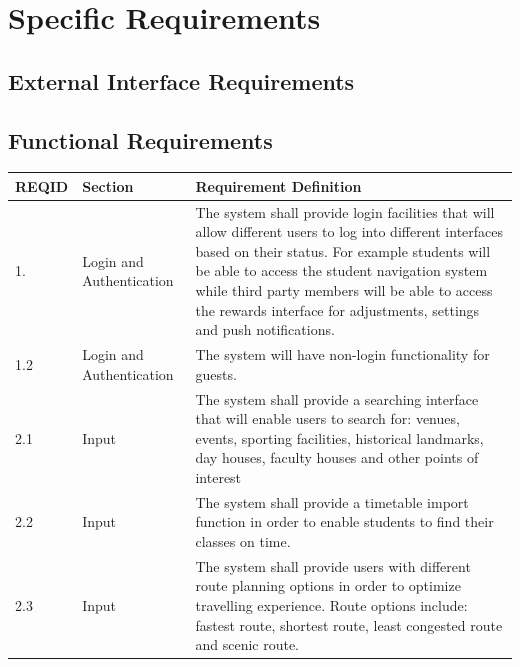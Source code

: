 \documentclass[12pt]{article}
\begin{document}
		
		
		
		
		
\section{Specific Requirements}

	\subsection{External Interface Requirements}
	
	\subsection{Functional Requirements}
	\begin{longtable}{|p{}| p{} | p{} |}
	
	\hline
	REQID& Section & Requirement Definition \\
	\hline
	1.& Login and Authentication & The system shall provide login facilities that will allow different users to log into different interfaces based on their status. For example students will be able to access the student navigation system while third party members will be able to access the rewards interface for adjustments, settings and push notifications.  \\

\hline

1.2& Login and Authentication   & The system will have non-login functionality for guests. \\

\hline

2.1& Input & The system shall provide a searching interface that will enable users to search for: venues, events, sporting facilities, historical landmarks, day houses, faculty houses and other points of interest  \\

\hline

2.2& Input  & The system shall provide a timetable import function in order to enable students to find their classes on time.  \\

\hline

2.3& Input  & The system shall provide users with different route planning options in order to optimize travelling experience. Route options include: fastest route, shortest route, least congested route and scenic route. \\


\end{longtable}
\end{document}

